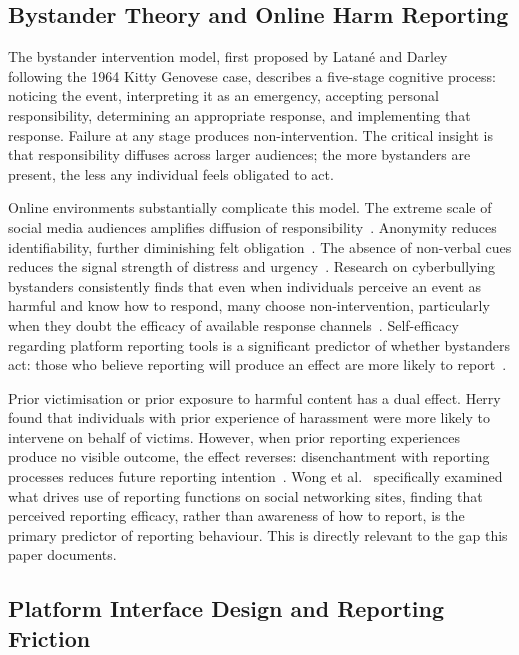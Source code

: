 \documentclass{ieee-portfolio}
\begin{document}
\subsection{Bystander Theory and Online Harm Reporting}
 
The bystander intervention model, first proposed by Latané and Darley~\cite{latane_unresponsive_1970} following the 1964 Kitty Genovese case, describes a five-stage cognitive process: noticing the event, interpreting it as an emergency, accepting personal responsibility, determining an appropriate response, and implementing that response. Failure at any stage produces non-intervention. The critical insight is that responsibility diffuses across larger audiences; the more bystanders are present, the less any individual feels obligated to act.
 
Online environments substantially complicate this model. The extreme scale of social media audiences amplifies diffusion of responsibility~\cite{jeyagobi_factors_2022}. Anonymity reduces identifiability, further diminishing felt obligation~\cite{chan_bystanders_2022}. The absence of non-verbal cues reduces the signal strength of distress and urgency~\cite{herry_gender_2022}. Research on cyberbullying bystanders consistently finds that even when individuals perceive an event as harmful and know how to respond, many choose non-intervention, particularly when they doubt the efficacy of available response channels~\cite{huang_severity_2023}. Self-efficacy regarding platform reporting tools is a significant predictor of whether bystanders act: those who believe reporting will produce an effect are more likely to report~\cite{jeyagobi_factors_2022}.
 
Prior victimisation or prior exposure to harmful content has a dual effect. Herry~\cite{herry_gender_2022} found that individuals with prior experience of harassment were more likely to intervene on behalf of victims. However, when prior reporting experiences produce no visible outcome, the effect reverses: disenchantment with reporting processes reduces future reporting intention~\cite{wong_combating_2016}. Wong et al.~\cite{wong_combating_2016} specifically examined what drives use of reporting functions on social networking sites, finding that perceived reporting efficacy, rather than awareness of how to report, is the primary predictor of reporting behaviour. This is directly relevant to the gap this paper documents.
 
\subsection{Platform Interface Design and Reporting Friction}
 
\end{document}
